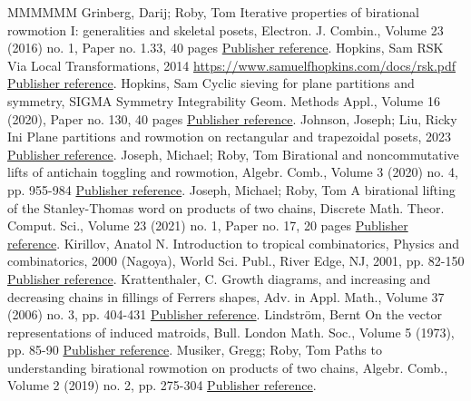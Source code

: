 \begin{thebibliography}{MMMMMM}
 Grinberg, Darij; Roby, Tom Iterative properties of birational rowmotion I: generalities and skeletal posets, Electron. J. Combin., Volume 23 (2016) no. 1, Paper no. 1.33, 40 pages \href{https://alco.centre-mersenne.org/articles/10.5802/alco.385/#grinbergroby1}{Publisher reference}.
 Hopkins, Sam RSK Via Local Transformations, 2014 \url{https://www.samuelfhopkins.com/docs/rsk.pdf} \href{https://alco.centre-mersenne.org/articles/10.5802/alco.385/#hopkins}{Publisher reference}.
 Hopkins, Sam Cyclic sieving for plane partitions and symmetry, SIGMA Symmetry Integrability Geom. Methods Appl., Volume 16 (2020), Paper no. 130, 40 pages \href{https://alco.centre-mersenne.org/articles/10.5802/alco.385/#hopkins3}{Publisher reference}.
 Johnson, Joseph; Liu, Ricky Ini Plane partitions and rowmotion on rectangular and trapezoidal posets, 2023 \href{https://alco.centre-mersenne.org/articles/10.5802/alco.385/#johnsonliu3}{Publisher reference}.
 Joseph, Michael; Roby, Tom Birational and noncommutative lifts of antichain toggling and rowmotion, Algebr. Comb., Volume 3 (2020) no. 4, pp. 955-984 \href{https://alco.centre-mersenne.org/articles/10.5802/alco.385/#josephroby2}{Publisher reference}.
 Joseph, Michael; Roby, Tom A birational lifting of the Stanley-Thomas word on products of two chains, Discrete Math. Theor. Comput. Sci., Volume 23 (2021) no. 1, Paper no. 17, 20 pages \href{https://alco.centre-mersenne.org/articles/10.5802/alco.385/#josephroby1}{Publisher reference}.
 Kirillov, Anatol N. Introduction to tropical combinatorics, Physics and combinatorics, 2000 (Nagoya), World Sci. Publ., River Edge, NJ, 2001, pp. 82-150 \href{https://alco.centre-mersenne.org/articles/10.5802/alco.385/#kirillov}{Publisher reference}.
 Krattenthaler, C. Growth diagrams, and increasing and decreasing chains in fillings of Ferrers shapes, Adv. in Appl. Math., Volume 37 (2006) no. 3, pp. 404-431 \href{https://alco.centre-mersenne.org/articles/10.5802/alco.385/#krattenthaler}{Publisher reference}.
 Lindström, Bernt On the vector representations of induced matroids, Bull. London Math. Soc., Volume 5 (1973), pp. 85-90 \href{https://alco.centre-mersenne.org/articles/10.5802/alco.385/#lindstrom}{Publisher reference}.
 Musiker, Gregg; Roby, Tom Paths to understanding birational rowmotion on products of two chains, Algebr. Comb., Volume 2 (2019) no. 2, pp. 275-304 \href{https://alco.centre-mersenne.org/articles/10.5802/alco.385/#musikerroby}{Publisher reference}.

\end{thebibliography}
